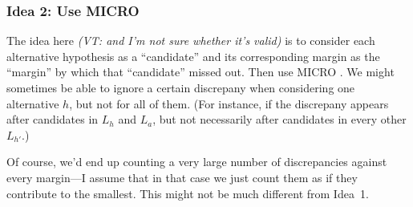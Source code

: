 \documentclass[10pt,a4paper]{article}
\newcommand{\VTNote}[1]{{\it(VT: #1)}}
\begin{document}
\subsubsection{Idea 2: Use MICRO}
The idea here \VTNote{ and I'm not sure whether it's valid} is to consider each alternative hypothesis as a ``candidate'' and its corresponding margin as the ``margin'' by which that ``candidate'' missed out.  Then use MICRO \cite{stark2008sharper}.  We might sometimes be able to ignore a certain discrepany when considering one alternative $h$, but not for all of them.  (For instance, if the discrepany appears after candidates in $L_h$ and $L_a$, but not necessarily after candidates in every other $L_{h'}$.)  

Of course, we'd end up counting a very large number of discrepancies against every margin---I assume that in that case we just count them as if they contribute to the smallest.  This might not be much different from Idea~1. 



\end{document}
